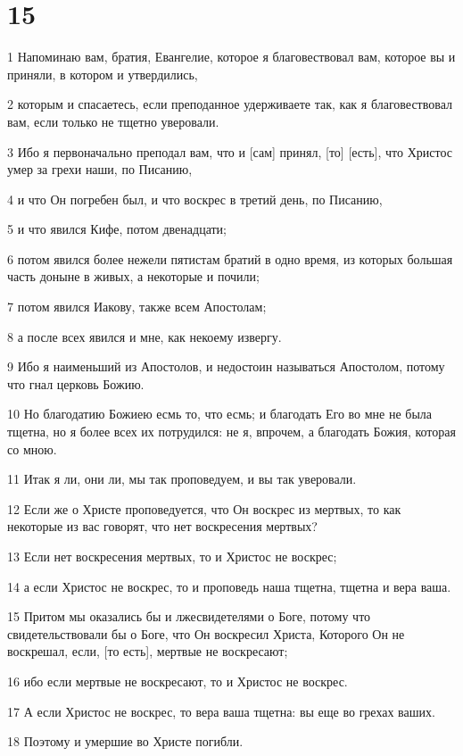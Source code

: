 \chapter{15}

\par 1 Напоминаю вам, братия, Евангелие, которое я благовествовал вам, которое вы и приняли, в котором и утвердились,
\par 2 которым и спасаетесь, если преподанное удерживаете так, как я благовествовал вам, если только не тщетно уверовали.
\par 3 Ибо я первоначально преподал вам, что и [сам] принял, [то] [есть], что Христос умер за грехи наши, по Писанию,
\par 4 и что Он погребен был, и что воскрес в третий день, по Писанию,
\par 5 и что явился Кифе, потом двенадцати;
\par 6 потом явился более нежели пятистам братий в одно время, из которых большая часть доныне в живых, а некоторые и почили;
\par 7 потом явился Иакову, также всем Апостолам;
\par 8 а после всех явился и мне, как некоему извергу.
\par 9 Ибо я наименьший из Апостолов, и недостоин называться Апостолом, потому что гнал церковь Божию.
\par 10 Но благодатию Божиею есмь то, что есмь; и благодать Его во мне не была тщетна, но я более всех их потрудился: не я, впрочем, а благодать Божия, которая со мною.
\par 11 Итак я ли, они ли, мы так проповедуем, и вы так уверовали.
\par 12 Если же о Христе проповедуется, что Он воскрес из мертвых, то как некоторые из вас говорят, что нет воскресения мертвых?
\par 13 Если нет воскресения мертвых, то и Христос не воскрес;
\par 14 а если Христос не воскрес, то и проповедь наша тщетна, тщетна и вера ваша.
\par 15 Притом мы оказались бы и лжесвидетелями о Боге, потому что свидетельствовали бы о Боге, что Он воскресил Христа, Которого Он не воскрешал, если, [то есть], мертвые не воскресают;
\par 16 ибо если мертвые не воскресают, то и Христос не воскрес.
\par 17 А если Христос не воскрес, то вера ваша тщетна: вы еще во грехах ваших.
\par 18 Поэтому и умершие во Христе погибли.
